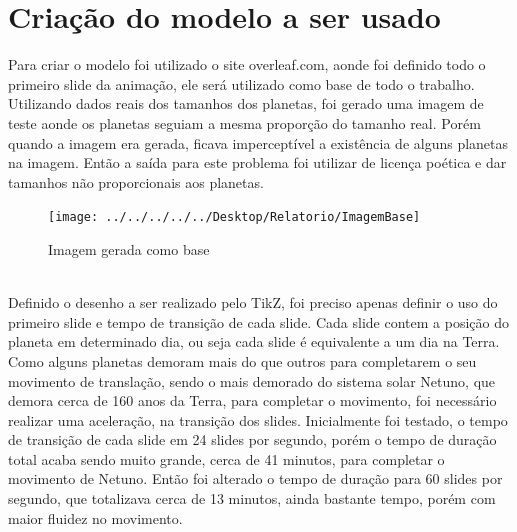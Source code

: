 \documentclass[
	12pt,				%
	openright,			%
	oneside,
	a4paper,			%
	english,			%
	french,				%
	spanish,			%
	brazil,				%
	]{abntex2}
\begin{document}
\section{Criação do modelo a ser usado}
	Para criar o modelo foi utilizado o site overleaf.com, aonde foi definido todo o primeiro slide da animação, ele será utilizado como base de todo o trabalho.
	\\ \indent  Utilizando dados reais dos tamanhos dos planetas, foi gerado uma imagem de teste aonde os planetas seguiam a mesma proporção do tamanho real. Porém quando a imagem era gerada, ficava imperceptível a existência de alguns planetas na imagem. Então a saída para este problema foi utilizar de licença poética e dar tamanhos não proporcionais aos planetas.\\
	\begin{figure}
		\centering
		\texttt{[image: ../../../../../Desktop/Relatorio/ImagemBase]}
		\caption{Imagem gerada como base}
		\label{fig:imagembase}
	\end{figure}
	\\ \indent Definido o desenho a ser realizado pelo TikZ, foi preciso apenas definir o uso do primeiro slide e tempo de transição de cada slide. Cada slide contem a posição do planeta em determinado dia, ou seja cada slide é equivalente a um dia na Terra. Como alguns planetas demoram mais do que outros para completarem o seu movimento de translação, sendo o mais demorado do sistema solar Netuno, que demora cerca de 160 anos da Terra, para completar o movimento, foi necessário realizar uma aceleração, na transição dos slides. Inicialmente foi testado, o tempo de transição de cada slide em 24 slides por segundo, porém o tempo de duração total acaba sendo muito grande, cerca de 41 minutos, para completar o movimento de Netuno. Então foi alterado o tempo de duração para 60 slides por segundo, que totalizava cerca de 13 minutos, ainda bastante tempo, porém com maior fluidez no movimento.
		
\end{document}
